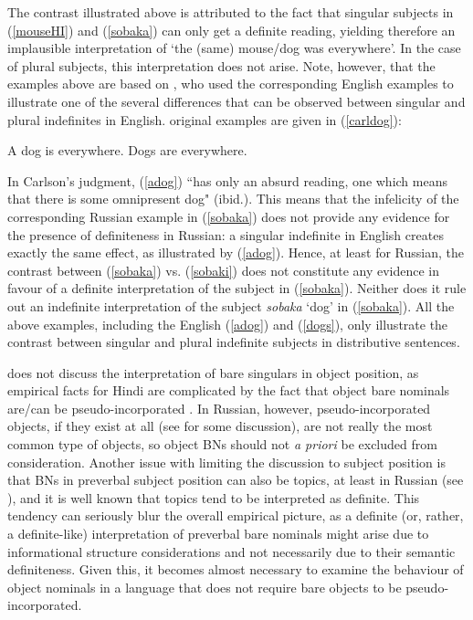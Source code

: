 \documentclass[output=paper,colorlinks,citecolor=brown]{langscibook}
\begin{document}
\noindent The contrast illustrated above is attributed to the fact that singular subjects in (\ref{mouseHI}) and (\ref{sobaka}) can only get a definite reading, yielding therefore an implausible interpretation of `the (same) mouse/dog was everywhere'. In the case of plural subjects, this interpretation does not arise. 
Note, however, that the examples above are based on \citet{carlson77}, who used the corresponding English examples to illustrate one of the several differences that can be observed between singular and plural indefinites in English.  original examples are given in (\ref{carldog}): 

\ea \label{carldog}
\ea A dog is everywhere. \label{adog}
\ex Dogs are everywhere. \label{dogs}\hfill\citep[13, ex. (26)--(27)]{carlson77}
\z
\z

\noindent In Carlson's judgment, (\ref{adog}) ``has only an absurd reading, one which means that there is some omnipresent dog" (ibid.). This means that the infelicity of the corresponding Russian example in (\ref{sobaka})  does not provide any evidence for the presence of definiteness in Russian: a singular indefinite in English creates exactly the same effect, as illustrated by (\ref{adog}). Hence, at least for Russian, the contrast between (\ref{sobaka}) vs. (\ref{sobaki}) does not constitute any evidence in favour of a definite interpretation of the subject in (\ref{sobaka}). Neither does it rule out an indefinite interpretation of the subject \textit{sobaka} `dog' in (\ref{sobaka}). All the above examples, including the English (\ref{adog}) and (\ref{dogs}), only illustrate the contrast between singular and plural indefinite subjects in distributive sentences.

\citet{dayal04} does not discuss the interpretation of bare singulars in object position, as empirical facts for Hindi are complicated by the fact that object bare nominals are/can be pseudo-incorporated \citep[cf.][]{dayal11, dayal15}. In Russian, however, pseudo-incorporated objects, if they exist at all (see \citealt {mueller15, seres20} for some discussion), are not really the most common type of objects, so object BNs should not \textit{a priori} be excluded from consideration. Another issue with limiting the discussion to subject position is that BNs in preverbal subject position can also be topics, at least in Russian (see ), and it is well known that topics tend to be interpreted as definite. This tendency can seriously blur the overall empirical picture, as a definite (or, rather, a definite-like) interpretation of preverbal bare nominals might arise due to informational structure considerations and not necessarily due to their semantic definiteness. Given this, it becomes almost necessary to examine the behaviour of object nominals in a language that does not require bare objects to be pseudo-incorporated. 
\end{document}
